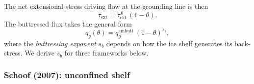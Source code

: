 \documentclass[11pt]{article}
\newcommand{\qg}{q_g}
\begin{document}
The net extensional stress driving flow at the grounding line is then
\begin{equation}
	\tau_{\mathrm{ext}} = \tau_{\mathrm{ext}}^{\,0}\,(1 - \theta).
	\label{eq:tau_ext}
\end{equation}
The buttressed flux takes the general form
\begin{equation}
	\qg(\theta) = \qg^{\,\mathrm{unbutt}}\,(1 - \theta)^{s_b},
	\label{eq:buttressed_flux}
\end{equation}
where the \emph{buttressing exponent} $s_b$ depends on how the ice shelf generates its back-stress.  We derive $s_b$ for three frameworks below.

\subsubsection{Schoof (2007): unconfined shelf}
\label{sec:sb_schoof}
\end{document}

